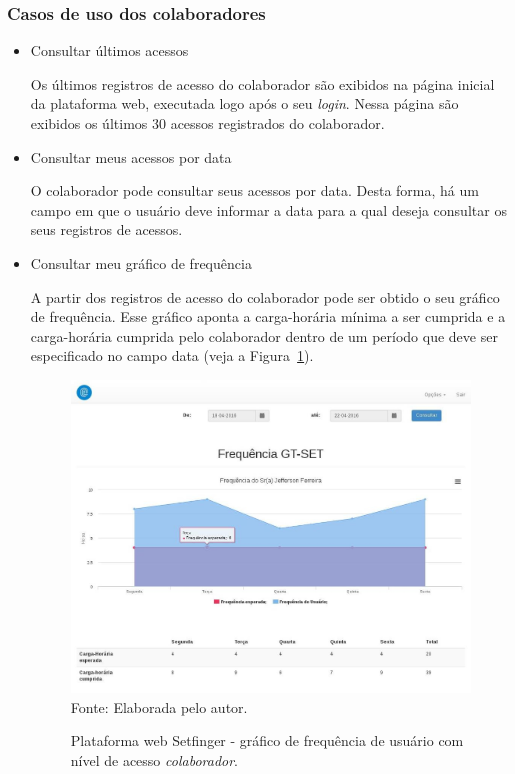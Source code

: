   \subsubsection{Casos de uso dos colaboradores\label{sec:caso_uso:usuario}}
  \begin{itemize}
  
    \item Consultar últimos acessos
    
    Os últimos registros de acesso do colaborador são exibidos na página inicial da plataforma web, executada logo após o seu \textit{login}. Nessa página são exibidos os últimos 30 acessos registrados do colaborador.   
    
    \item Consultar meus acessos por data
    
    O colaborador pode consultar seus acessos por data. Desta forma, há um campo em que o usuário deve informar a data para a qual deseja consultar os seus registros de acessos.
    
    \item Consultar meu gráfico de frequência
  
    A partir dos registros de acesso do colaborador pode ser obtido o seu gráfico de frequência. Esse gráfico aponta a carga-horária mínima a ser cumprida e a carga-horária cumprida pelo colaborador dentro de um período que deve ser especificado no campo data (veja a Figura~\ref{web_frequencia_colaborador}).
  
    \begin{figure}[!ht]
    \begin{center}
    \caption{Plataforma web Setfinger - gráfico de frequência de usuário com nível de acesso \textit{colaborador}.}
     \includegraphics[scale=0.4]{figuras/cap4/web_frequencia_colaborador.jpg}\\
    Fonte: Elaborada pelo autor.
    \label{web_frequencia_colaborador}
    \end{center}
    \end{figure}
  
  
  
  \end{itemize}
  

